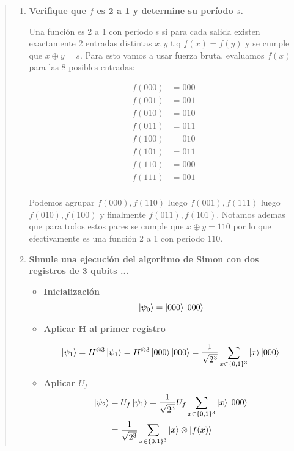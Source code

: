 \begin{quote}
    \begin{enumerate}
        \item \textbf{Verifique que $f$ es 2 a 1 y determine su período $s$.}

            Una función es 2 a 1 con periodo s si para cada salida existen exactamente 2 entradas
            distintas $x,y$ t.q $f(x)=f(y)$ y se cumple que $x\oplus y =s$. Para esto vamos a usar
            fuerza bruta, evaluamos $f(x)$ para las 8 posibles entradas:

            \begin{align*}
                f(000) &= 000 \\  
                f(001) &= 001 \\  
                f(010) &= 010 \\  
                f(011) &= 011 \\  
                f(100) &= 010 \\  
                f(101) &= 011 \\  
                f(110) &= 000 \\  
                f(111) &= 001 \\  
            \end{align*}

            Podemos agrupar $f(000),f(110)$ luego $f(001),f(111)$ luego $f(010),f(100)$ y finalmente
            $f(011),f(101)$. Notamos ademas que para todos estos pares se cumple que $x \oplus y =
            110$ por lo que efectivamente es una función 2 a 1 con periodo $110$.

        \item \textbf{Simule una ejecución del algoritmo de Simon con dos registros de 3 qubits ...}

            \begin{itemize}
                \item \textbf{Inicialización}
                    $$
                    \ket{\psi_0} = \ket{000} \ket{000}
                    $$

                \item \textbf{Aplicar H al primer registro}

                    $$
                        \ket{\psi_1} = H^{\otimes 3}\ket{\psi_1} = H^{\otimes 3}\ket{000} \ket{000}
                        = \frac{1}{\sqrt{2^3}}\sum _{x \in \{0,1\}^3} \ket{x} \ket{000}
                    $$

                \item \textbf{Aplicar $U_f$}
                    \begin{align*}
                        \ket{\psi_2} &= U_f \ket{\psi_1} = \frac{1}{\sqrt{2^3}} U_f \sum _{x \in
                        \{0,1\}^3} \ket{x} \ket{000} \\ 
                                     &= \frac{1}{\sqrt{2^3}} \sum _{x \in \{0,1\}^3} \ket{x} \otimes
                                     \ket{f(x)}
                    \end{align*}


\end{itemize}
\end{enumerate}
\end{quote}
